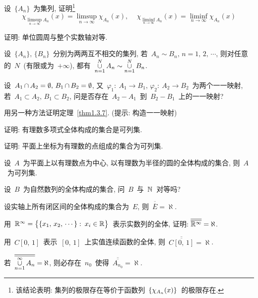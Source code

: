 \begin{problemset}
\item 设~$\{A_n\}$~为集列, 证明\footnote{该结论表明: 集列的极限存在等价于函数列~$\{\chi_{\tiny{A_n}}(x)\}$~的极限存在. }
\[
\chi_{\limsup\limits_{n \to \infty} A_n}(x) = \limsup_{n \to \infty} \chi_{A_n}(x), \, \quad \chi_{\liminf\limits_{n \to \infty} A_n}(x) = \liminf_{n \to \infty} \chi_{A_n}(x)
\]

\item 证明: 单位圆周与整个实数轴对等.

\item 设~$\{A_n\}, \, \{B_n\}$~分别为两两互不相交的集列, 若~$A_n \sim B_n, \, n=1,\,2,\,\cdots$, 则对任意的~$N$~(有限或为~$+\infty$), 都有~$\mathop{\cup}\limits_{n=1}^N A_n \sim \mathop{\cup}\limits_{n=1}^N B_n$.

\item 设~$A_1 \mathop{\cap} A_2 = \emptyset, \, B_1 \mathop{\cap} B_2 = \emptyset$, 又~$\varphi_1:\:A_1 \rightarrow B_1,\, \varphi_2:\: A_2 \rightarrow B_2$~为两个一一映射, 若~$A_1 \subset A_2, \, B_1 \subset B_2$, 问是否存在~$A_2-A_1$~到~$B_2-B_1$~上的一一映射?

\item 用另一种方法证明定理~\ref{thm1.3.7}. (提示: 构造一一映射)

\item 证明: 有理数多项式全体构成的集合是可列集.

\item 证明: 平面上坐标为有理数的点组成的集合为可列集.

\item 设~$A$~为平面上以有理数点为中心, 以有理数为半径的圆的全体构成的集合, 则~$A$~为可列集.

\item 设~$B$~为自然数列的全体构成的集合, 问~$B$~与~$\mathbb{N}$~对等吗?

\item 设实轴上所有闭区间的全体构成的集合为~$E$, 则~$\overline{\overline{E}} = \aleph$.

\item 用~$\mathbb{R}^\infty = \big\{\{x_1, \, x_2, \, \cdots\}: \: x_i \in \mathbb{R} \big\}$~表示实数列的全体, 证明: $\overline{\overline{\mathbb{R}^\infty}} = \aleph$.

\item 用~$C[0,\,1]$~表示~$[0,\,1]$~上实值连续函数的全体,
      则~$\overline{\overline{C[0,\,1]}} = \aleph$.

\item 若~$\overline{\overline{\mathop{\cup}\limits_{n=1}^\infty A_n}} = \aleph$, 则必存在~$n_0$~使得~$\overline{\overline{A_{n_0}}} = \aleph$.


\end{problemset}
